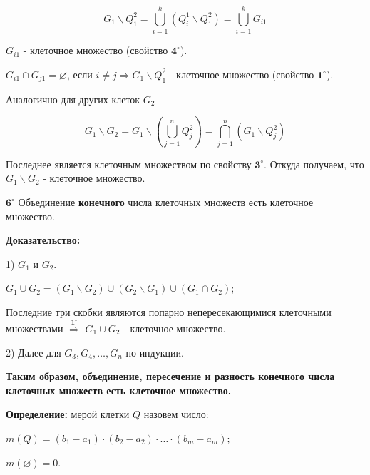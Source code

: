 \documentclass[a4paper,12pt]{article} %
\begin{document}
	
	\begin{equation*}
		G_1 \backslash Q_1^2 = \bigcup_{i = 1}^k \left(Q_i^1 \backslash Q_1^2\right) = \bigcup_{i = 1}^k G_{i1} 
	\end{equation*}
	
	
	$G_{i1}$ - клеточное множество (свойство $\textbf{4}^\circ$).
	
	$G_{i1} \cap G_{j1} = \varnothing$, если $i \neq j \Rightarrow G_1 \backslash Q_1^2$ - клеточное множество (свойство $\textbf{1}^\circ$). 
	
	Аналогично для других клеток $G_2$
	
	\begin{equation*}
		G_1 \backslash G_2 = G_1 \backslash \left( \bigcup_{j = 1}^n Q_j^2\right) = \bigcap_{j = 1}^n\left(G_1 \backslash Q_j^2\right)
	\end{equation*}
	
	Последнее является клеточным множеством по свойству $\textbf{3}^\circ$. Откуда получаем, что $G_1\backslash G_2$ - клеточное множество.
	
	\vspace{5mm}
	
	$\textbf{6}^\circ$ Объединение \textbf{конечного} числа клеточных множеств есть клеточное множество.
	
	\textbf{Доказательство:}
	
	1) $G_1$ и $G_2$.
	
	$G_1 \cup G_2 = \left(G_1 \backslash G_2\right) \cup \left(G_2 \backslash G_1\right) \cup \left(G_1 \cap G_2\right)$;
	
	Последние три скобки являются попарно непересекающимися клеточными множествами $\stackrel{\textbf{1}^\circ}{\Rightarrow}$ $G_1 \cup G_2$ - клеточное множество.
	
	2) Далее для $G_3, G_4, \ldots, G_n$ по индукции.
	
	\vspace{7mm}
	
	\textbf{Таким образом, объединение, пересечение и разность конечного числа клеточных множеств есть клеточное множество.}
	
	\vspace{7mm}
	
	\underline{\textbf{Определение:}} мерой клетки $Q$ назовем число:
	
	$m(Q) = (b_1 - a_1)\cdot (b_2 - a_2)\cdot\ldots\cdot (b_m - a_m)$;
	
	$m(\varnothing) = 0$.\\
	
\end{document}
